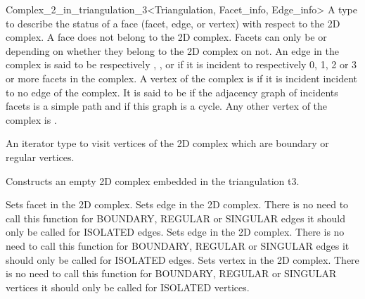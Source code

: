 \begin{ccRefClass}{Complex_2_in_triangulation_3<Triangulation, Facet_info, Edge_info>}
{A type to describe the status of a face (facet, edge, or vertex) with respect to 
the 2D complex. A  face does not belong to the 2D complex.
Facets can only be    or 
depending on whether they belong to the 2D complex on not.
An edge in the complex is said to be respectively , 
,
 or 
 if it is incident to respectively 0, 1, 2  or 3 or
more facets in the complex. A vertex of the complex is
 if it is incident incident to no edge of the complex.
It is said to be   
if the adjacency graph of incidents facets 
is a simple path  and  if this graph is  a cycle.
Any other vertex of the complex is .}


\ccGlue
{}
\ccGlue
{}
\ccGlue
{}
\ccGlue
{}
\ccGlue
{}
\ccGlue
{}
\ccGlue
{}
{An iterator type to visit 
vertices of the 2D complex which are boundary  or regular vertices.}



\ccCreation
{}  %

{Constructs an empty 2D complex embedded in the triangulation t3.}



\ccGlue
{}
{Sets facet  in the 2D complex.}
\ccGlue
{}
{Sets edge  in the 2D complex.
There is no need to call this function  for BOUNDARY,  
REGULAR or SINGULAR edges
it should only be called  for ISOLATED edges.}
\ccGlue
{}
{Sets edge in the 2D complex.
There is no need to call this function  for BOUNDARY,  
REGULAR or SINGULAR edges
it should only be called  for ISOLATED edges.}
\ccGlue
{}
{Sets vertex   in the 2D complex.
There is no need to call this function  for BOUNDARY,  
REGULAR or SINGULAR vertices
it should only be called  for ISOLATED vertices.}


\end{ccRefClass}
